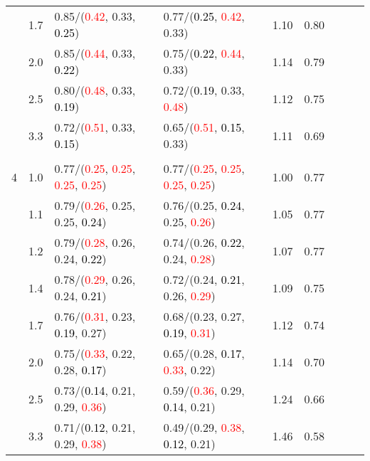 \documentclass[10pt,a4paper]{report}
\begin{document}
\begin{table}[!htbp]
\begin{center}
{\begin{tabular}{ccllccccc}
			&1.7&0.85/(\textcolor{red}{0.42}, 0.33, \textcolor{black}{0.25})&0.77/(\textcolor{black}{0.25}, \textcolor{red}{0.42}, 0.33)&1.10&0.80\\
			&2.0&0.85/(\textcolor{red}{0.44}, 0.33, \textcolor{black}{0.22})&0.75/(\textcolor{black}{0.22}, \textcolor{red}{0.44}, 0.33)&1.14&0.79\\
			&2.5&0.80/(\textcolor{red}{0.48}, 0.33, \textcolor{black}{0.19})&0.72/(\textcolor{black}{0.19}, 0.33, \textcolor{red}{0.48})&1.12&0.75\\
			&3.3&0.72/(\textcolor{red}{0.51}, 0.33, \textcolor{black}{0.15})&0.65/(\textcolor{red}{0.51}, \textcolor{black}{0.15}, 0.33)&1.11&0.69\\
			&&&&\\
			4			&1.0&0.77/(\textcolor{red}{0.25}, \textcolor{red}{0.25}, \textcolor{red}{0.25}, \textcolor{red}{0.25})&0.77/(\textcolor{red}{0.25}, \textcolor{red}{0.25}, \textcolor{red}{0.25}, \textcolor{red}{0.25})&1.00&0.77\\
			&1.1&0.79/(\textcolor{red}{0.26}, 0.25, 0.25, \textcolor{black}{0.24})&0.76/(0.25, \textcolor{black}{0.24}, 0.25, \textcolor{red}{0.26})&1.05&0.77\\
			&1.2&0.79/(\textcolor{red}{0.28}, 0.26, 0.24, \textcolor{black}{0.22})&0.74/(0.26, \textcolor{black}{0.22}, 0.24, \textcolor{red}{0.28})&1.07&0.77\\
			&1.4&0.78/(\textcolor{red}{0.29}, 0.26, 0.24, \textcolor{black}{0.21})&0.72/(0.24, \textcolor{black}{0.21}, 0.26, \textcolor{red}{0.29})&1.09&0.75\\
			&1.7&0.76/(\textcolor{red}{0.31}, 0.23, \textcolor{black}{0.19}, 0.27)&0.68/(0.23, 0.27, \textcolor{black}{0.19}, \textcolor{red}{0.31})&1.12&0.74\\
			&2.0&0.75/(\textcolor{red}{0.33}, 0.22, 0.28, \textcolor{black}{0.17})&0.65/(0.28, \textcolor{black}{0.17}, \textcolor{red}{0.33}, 0.22)&1.14&0.70\\
			&2.5&0.73/(\textcolor{black}{0.14}, 0.21, 0.29, \textcolor{red}{0.36})&0.59/(\textcolor{red}{0.36}, 0.29, \textcolor{black}{0.14}, 0.21)&1.24&0.66\\
			&3.3&0.71/(\textcolor{black}{0.12}, 0.21, 0.29, \textcolor{red}{0.38})&0.49/(0.29, \textcolor{red}{0.38}, \textcolor{black}{0.12}, 0.21)&1.46&0.58\\
			\bottomrule
		\end{tabular}}
	\end{center}
\end{table}
\end{document}
